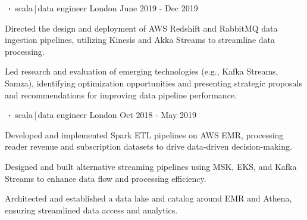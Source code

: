 \begin{cventries}
    \cventry
    {      }
    {$\sqbig$scala\,|\,data engineer}
    {London}
    {June 2019 - Dec 2019}
    {}
    {
        \begin{cvitems}
            \item{Directed the design and deployment of AWS Redshift and RabbitMQ data ingestion pipelines, utilizing Kinesis and Akka Streams to streamline data processing.}
            \item{Led research and evaluation of emerging technologies (e.g., Kafka Streams, Samza), identifying optimization opportunities and presenting strategic proposals and recommendations for improving data pipeline performance.}
        \end{cvitems}
    }

    \cventry
    {     }
    {$\sqbig$scala\,|\,data engineer}
    {London}
    {Oct 2018 - May 2019}
    {}
    {
        \begin{cvitems}
            \item{Developed and implemented Spark ETL pipelines on AWS EMR, processing reader revenue and subscription datasets to drive data-driven decision-making.}
            \item{Designed and built alternative streaming pipelines using MSK, EKS, and Kafka Streams to enhance data flow and processing efficiency.}
            \item{Architected and established a data lake and catalog around EMR and Athena, ensuring streamlined data access and analytics.}
        \end{cvitems}
    }


\end{cventries}
